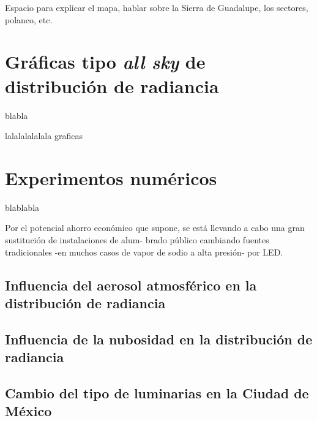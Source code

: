 \newpage

Espacio para explicar el mapa, hablar sobre la Sierra de Guadalupe, los sectores, polanco, etc.

\section{Gráficas tipo \textit{all sky} de distribución de radiancia}

blabla 

\newpage

lalalalalalala graficas
\newpage

\section{Experimentos numéricos}

blablabla

Por el potencial ahorro económico que supone, se está llevando a cabo una gran sustitución de instalaciones de alum-
brado público cambiando fuentes tradicionales -en muchos casos de vapor de sodio a alta presión- por LED.

\newpage

\subsection{Influencia del aerosol atmosférico en la distribución de radiancia}

\newpage

\subsection{Influencia de la nubosidad en la distribución de radiancia}

\newpage

\subsection{Cambio del tipo de luminarias en la Ciudad de México}

\newpage
